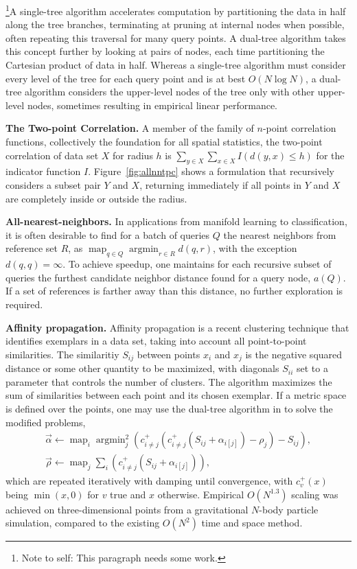 \documentclass[times, leqno,twocolumn]{article}
\newcommand{\authornote}[1]{\footnote{Note to self: #1}}
\DeclareMathOperator*{\map}{map}
\DeclareMathOperator*{\argmin}{argmin}
\newcommand{\ocpos}[1]{c^{+}_{#1}}
\newcommand{\cpos}[2]{\ocpos{#1 \neq #2}}
\newcommand{\simil}[2]{S_{#1#2}}
\newcommand{\vecrho}{\vec{\rho}}
\newcommand{\vecalpha}{\vec{\alpha}}
\newcommand{\frho}[1]{\rho_{#1}}
\newcommand{\falphaj}[2]{\alpha_{#1[#2]}}
\begin{document}
\authornote{This paragraph needs some work.}A single-tree algorithm accelerates computation by partitioning the data in half along the tree branches, terminating at pruning at internal nodes when possible, often repeating this traversal for many query points.
A dual-tree algorithm takes this concept further by looking at pairs of nodes, each time partitioning the Cartesian product of data in half.
Whereas a single-tree algorithm must consider every level of the tree for each query point and is at best $O(N \log N)$, a dual-tree algorithm considers the upper-level nodes of the tree only with other upper-level nodes, sometimes resulting in empirical linear performance.

{\bf The Two-point Correlation.} A member of the family of $n$-point correlation functions, collectively the foundation for all spatial statistics, the two-point correlation of data set $X$ for radius $h$ is
$\sum_{y \in X} \sum_{x \in X} I(d(y, x) \leq h)$ for the indicator function $I$.
Figure~\ref{fig:allnntpc} shows a formulation that recursively considers a subset pair $Y$ and $X$, returning immediately if all points in $Y$ and $X$ are completely inside or outside the radius.

{\bf All-nearest-neighbors.} In applications from manifold learning to classification, it is often desirable to find for a batch of queries $Q$ the nearest neighbors from reference set $R$, as $\map_{q \in Q} \argmin_{r \in R} d(q,r)$, with the exception $d(q,q) = \infty$.
To achieve speedup, one maintains for each recursive subset of queries the furthest candidate neighbor distance found for a query node, $a(Q)$.
If a set of references is farther away than this distance, no further exploration is required.

{\bf Affinity propagation.}
Affinity propagation is a recent clustering technique that identifies exemplars in a data set, taking into account all point-to-point similarities\cite{frey_dueck}.
The similaritiy $\simil{i}{j}$ between points $x_i$ and $x_j$ is the negative squared distance or some other quantity to be maximized, with diagonals $\simil{i}{i}$ set to a parameter that controls the number of clusters.
The algorithm maximizes the sum of similarities between each point and its chosen exemplar.
If a metric space is defined over the points, one may use the dual-tree algorithm in \cite{ryan_nips} to solve the modified problems,
\[ \begin{array}{l}
  \vecalpha \gets \map_{i} \argmin^2_{j} \!\left( \cpos{i}{j}(\cpos{i}{j}(\simil{i}{j} + \falphaj{i}{j}) - \frho{j}) - \simil{i}{j} \right)\! ,
  \\
  \vecrho \gets \map_{j} \sum_{i} \!\left( \cpos{i}{j}(\simil{i}{j} + \falphaj{i}{j}) \right)\!,
\end{array} \]
\noindent which are repeated iteratively with damping until convergence, with $\ocpos{v}(x)$ being $\min(x, 0)$ for $v$ true and $x$ otherwise.
Empirical $O(N^{1.3})$ scaling was achieved on three-dimensional points from a gravitational $N$-body particle simulation, compared to the existing $O(N^2)$ time and space method.
\end{document}
